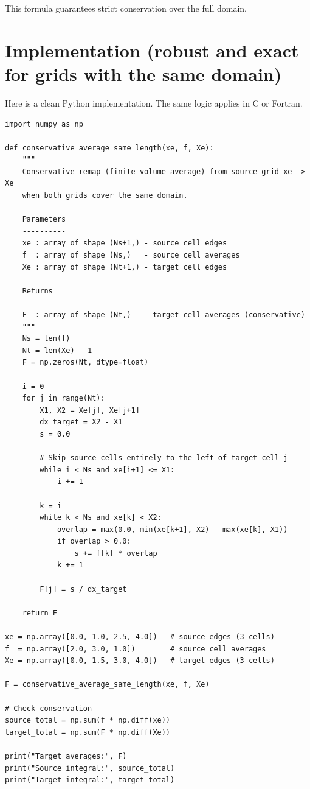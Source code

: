 \documentclass[a4paper,10pt]{article}
\begin{document}
This formula guarantees strict conservation over the full domain.

\section{Implementation (robust and exact for grids with the same domain)}

Here is a clean Python implementation. The same logic applies in C or Fortran.

\begin{verbatim}
import numpy as np

def conservative_average_same_length(xe, f, Xe):
    """
    Conservative remap (finite-volume average) from source grid xe -> Xe
    when both grids cover the same domain.

    Parameters
    ----------
    xe : array of shape (Ns+1,) - source cell edges
    f  : array of shape (Ns,)   - source cell averages
    Xe : array of shape (Nt+1,) - target cell edges

    Returns
    -------
    F  : array of shape (Nt,)   - target cell averages (conservative)
    """
    Ns = len(f)
    Nt = len(Xe) - 1
    F = np.zeros(Nt, dtype=float)

    i = 0
    for j in range(Nt):
        X1, X2 = Xe[j], Xe[j+1]
        dx_target = X2 - X1
        s = 0.0

        # Skip source cells entirely to the left of target cell j
        while i < Ns and xe[i+1] <= X1:
            i += 1

        k = i
        while k < Ns and xe[k] < X2:
            overlap = max(0.0, min(xe[k+1], X2) - max(xe[k], X1))
            if overlap > 0.0:
                s += f[k] * overlap
            k += 1

        F[j] = s / dx_target

    return F

xe = np.array([0.0, 1.0, 2.5, 4.0])   # source edges (3 cells)
f  = np.array([2.0, 3.0, 1.0])        # source cell averages
Xe = np.array([0.0, 1.5, 3.0, 4.0])   # target edges (3 cells)

F = conservative_average_same_length(xe, f, Xe)

# Check conservation
source_total = np.sum(f * np.diff(xe))
target_total = np.sum(F * np.diff(Xe))

print("Target averages:", F)
print("Source integral:", source_total)
print("Target integral:", target_total)
\end{verbatim}
\end{document}
